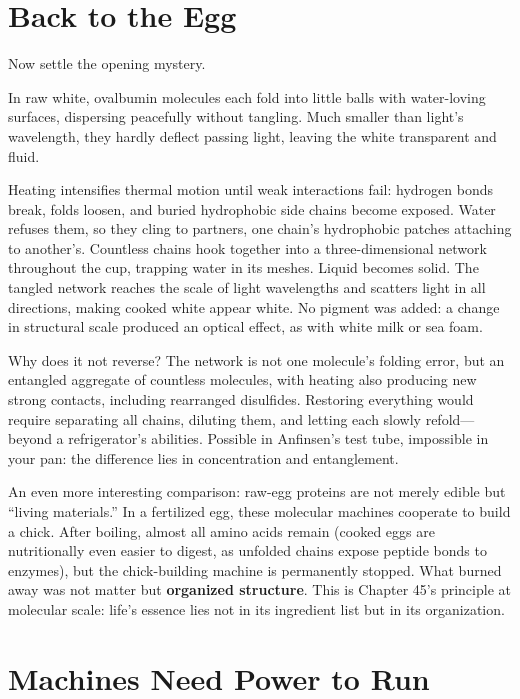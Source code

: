 \section{Back to the Egg}

Now settle the opening mystery.

In raw white, ovalbumin molecules each fold into little balls with water-loving surfaces, dispersing peacefully without tangling. Much smaller than light's wavelength, they hardly deflect passing light, leaving the white transparent and fluid.

Heating intensifies thermal motion until weak interactions fail: hydrogen bonds break, folds loosen, and buried hydrophobic side chains become exposed. Water refuses them, so they cling to partners, one chain's hydrophobic patches attaching to another's. Countless chains hook together into a three-dimensional network throughout the cup, trapping water in its meshes. Liquid becomes solid. The tangled network reaches the scale of light wavelengths and scatters light in all directions, making cooked white appear white. No pigment was added: a change in structural scale produced an optical effect, as with white milk or sea foam.

Why does it not reverse? The network is not one molecule's folding error, but an entangled aggregate of countless molecules, with heating also producing new strong contacts, including rearranged disulfides. Restoring everything would require separating all chains, diluting them, and letting each slowly refold---beyond a refrigerator's abilities. Possible in Anfinsen's test tube, impossible in your pan: the difference lies in concentration and entanglement.

An even more interesting comparison: raw-egg proteins are not merely edible but ``living materials.'' In a fertilized egg, these molecular machines cooperate to build a chick. After boiling, almost all amino acids remain (cooked eggs are nutritionally even easier to digest, as unfolded chains expose peptide bonds to enzymes), but the chick-building machine is permanently stopped. What burned away was not matter but \textbf{organized structure}. This is Chapter 45's principle at molecular scale: life's essence lies not in its ingredient list but in its organization.

\section{Machines Need Power to Run}

